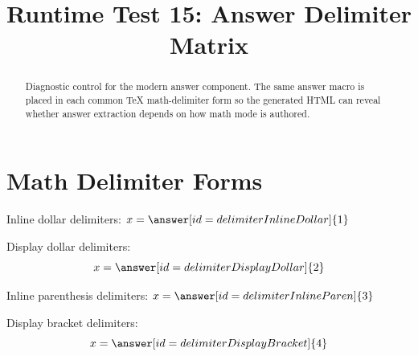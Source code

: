 \documentclass{ximera}
\title{Runtime Test 15: Answer Delimiter Matrix}
\begin{document}
\begin{abstract}
Diagnostic control for the modern answer component. The same answer macro is
placed in each common TeX math-delimiter form so the generated HTML can reveal
whether answer extraction depends on how math mode is authored.
\end{abstract}
\maketitle

\section{Math Delimiter Forms}

\begin{problem}
Inline dollar delimiters:
$x=\answer[id=delimiterInlineDollar]{1}$
\end{problem}

\begin{problem}
Display dollar delimiters:
$$
x=\answer[id=delimiterDisplayDollar]{2}
$$
\end{problem}

\begin{problem}
Inline parenthesis delimiters:
\(
x=\answer[id=delimiterInlineParen]{3}
\)
\end{problem}

\begin{problem}
Display bracket delimiters:
\[
x=\answer[id=delimiterDisplayBracket]{4}
\]
\end{problem}
\end{document}
